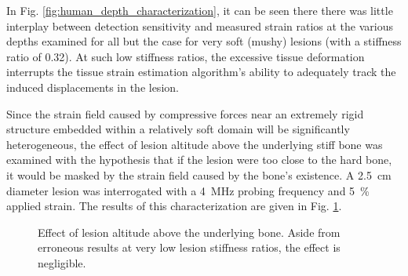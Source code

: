 			In Fig. \ref{fig:human_depth_characterization}, it can be seen there there was little interplay between detection sensitivity and measured strain ratios at the various depths examined for all but the case for very soft (mushy) lesions (with a stiffness ratio of 0.32). At such low stiffness ratios, the excessive tissue deformation interrupts the tissue strain estimation algorithm's ability to adequately track the induced displacements in the lesion.

			Since the strain field caused by compressive forces near an extremely rigid structure embedded within a relatively soft domain will be significantly heterogeneous, the effect of lesion altitude above the underlying stiff bone was examined with the hypothesis that if the lesion were too close to the hard bone, it would be masked by the strain field caused by the bone's existence. A \SI{2.5}{cm} diameter lesion was interrogated with a \SI{4}{MHz} probing frequency and \SI{5}{\percent} applied strain. The results of this characterization are given in Fig. \ref{fig:bottomsep_characterization}.

			\begin{figure}[!t]
				\centering
				\caption[Lesion altitude characterization]{Effect of lesion altitude above the underlying bone. Aside from erroneous results at very low lesion stiffness ratios, the effect is negligible.}
				\label{fig:bottomsep_characterization}
			\end{figure}

